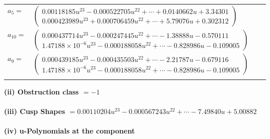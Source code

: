 \documentclass[1p]{elsarticle_modified}
\theoremstyle{definition}
\begin{document}
\begin{tabular}{m{7pt} m{180pt} m{7pt} m{180pt} }
\flushright $a_{5}=$&$\begin{pmatrix}0.00118185 u^{23}-0.000522705 u^{22}+\cdots+0.0140662 u+3.34301\\0.000423989 u^{23}+0.000706459 u^{22}+\cdots+5.79076 u+0.302312\end{pmatrix}$ \\
\flushright $a_{10}=$&$\begin{pmatrix}0.000437714 u^{23}-0.000247445 u^{22}+\cdots-1.38888 u-0.570111\\1.47188\times10^{-6} u^{23}-0.000188058 u^{22}+\cdots-0.828986 u-0.109005\end{pmatrix}$ \\
\flushright $a_{9}=$&$\begin{pmatrix}0.000439185 u^{23}-0.000435503 u^{22}+\cdots-2.21787 u-0.679116\\1.47188\times10^{-6} u^{23}-0.000188058 u^{22}+\cdots-0.828986 u-0.109005\end{pmatrix}$\\&\end{tabular}
\flushleft \textbf{(ii) Obstruction class $= -1$}\\~\\
\flushleft \textbf{(iii) Cusp Shapes $= 0.00110204 u^{23}-0.000567243 u^{22}+\cdots-7.49840 u+5.00882$}\\~\\
\newpage\renewcommand{\arraystretch}{1}
\flushleft \textbf{(iv) u-Polynomials at the component}\newline \\
\end{document}
